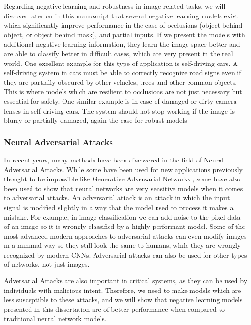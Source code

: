 \documentclass[b5paper]{book}
\let\cite\parencite
\begin{document}
Regarding negative learning and robustness in image related tasks, we will discover later on in this manuscript that several negative learning models exist which significantly improve performance in the case of occlusions (object behind object, or object behind mask), and partial inputs. If we present the models with additional negative learning information, they learn the image space better and are able to classify better in difficult cases, which are very present in the real world. One excellent example for this type of application is self-driving cars. A self-driving system in cars must be able to correctly recognize road signs even if they are partially obscured by other vehicles, trees and other common objects. This is where models which are resilient to occlusions are not just necessary but essential for safety. One similar example is in case of damaged or dirty camera lenses in self driving cars. The system should not stop working if the image is blurry or partially damaged, again the case for robust models.

\subsubsection{Neural Adversarial Attacks}

In recent years, many methods have been discovered in the field of Neural Adversarial Attacks. \cite{goodfellowexplaining} While some have been used for new applications previously thought to be impossible like Generative Adversarial Networks \cite{goodfellow2014generative}, some have also been used to show that neural networks are very sensitive models when it comes to adversarial attacks. An adversarial attack is an attack in which the input signal is modified slightly in a way that the model used to process it makes a mistake. For example, in image classification we can add noise to the pixel data of an image so it is wrongly classified by a highly performant model. Some of the most advanced modern approaches to adversarial attacks can even modify images in a minimal way so they still look the same to humans, while they are wrongly recognized by modern CNNs. Adversarial attacks can also be used for other types of networks, not just images. 

Adversarial Attacks are also important in critical systems, as they can be used by individuals with malicious intent. Therefore, we need to make models which are less susceptible to these attacks, and we will show that negative learning models presented in this dissertation are of better performance when compared to traditional neural network models.  
\end{document}
